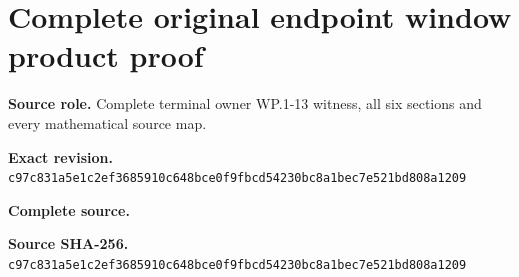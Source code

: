 \begingroup
\sloppy
\small
\clearpage
\section{Complete original endpoint window product proof}
\noindent\textbf{Source role.} Complete terminal owner WP.1-13 witness, all six sections and every mathematical source map.\par
\noindent\textbf{Exact revision.} \nolinkurl{c97c831a5e1c2ef3685910c648bce0f9fbcd54230bc8a1bec7e521bd808a1209}\par
\noindent\textbf{Complete source.} \par
\noindent\textbf{Source SHA-256.} \nolinkurl{c97c831a5e1c2ef3685910c648bce0f9fbcd54230bc8a1bec7e521bd808a1209}\par\medskip

\endgroup
